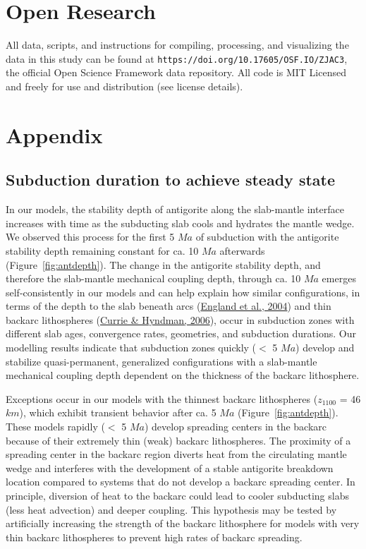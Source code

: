 \documentclass[draft,linenumbers]{agujournal2018}
\begin{document}
\hypertarget{open-research}{%
\section{Open Research}\label{open-research}}

All data, scripts, and instructions for compiling, processing, and
visualizing the data in this study can be found at
\texttt{https://doi.org/10.17605/OSF.IO/ZJAC3}, the official Open
Science Framework data repository. All code is MIT Licensed and freely
for use and distribution (see license details).

\clearpage

\appendix
\section{Appendix}

\hypertarget{subduction-duration-to-achieve-steady-state}{%
\subsection{Subduction duration to achieve steady
state}\label{subduction-duration-to-achieve-steady-state}}

In our models, the stability depth of antigorite along the slab-mantle
interface increases with time as the subducting slab cools and hydrates
the mantle wedge. We observed this process for the first 5 \(Ma\) of
subduction with the antigorite stability depth remaining constant for
ca. 10 \(Ma\) afterwards (Figure~\ref{fig:antdepth}). The change in the
antigorite stability depth, and therefore the slab-mantle mechanical
coupling depth, through ca. 10 \(Ma\) emerges self-consistently in our
models and can help explain how similar configurations, in terms of the
depth to the slab beneath arcs
(\protect\hyperlink{ref-England2004}{England et al., 2004}) and thin
backarc lithospheres (\protect\hyperlink{ref-Currie2006}{Currie \&
Hyndman, 2006}), occur in subduction zones with different slab ages,
convergence rates, geometries, and subduction durations. Our modelling
results indicate that subduction zones quickly (\(<\) 5 \(Ma\)) develop
and stabilize quasi-permanent, generalized configurations with a
slab-mantle mechanical coupling depth dependent on the thickness of the
backarc lithosphere.

Exceptions occur in our models with the thinnest backarc lithospheres
(\(z_{1100}\) = 46 \(km\)), which exhibit transient behavior after ca. 5
\(Ma\) (Figure~\ref{fig:antdepth}). These models rapidly (\(<\) 5
\(Ma\)) develop spreading centers in the backarc because of their
extremely thin (weak) backarc lithospheres. The proximity of a spreading
center in the backarc region diverts heat from the circulating mantle
wedge and interferes with the development of a stable antigorite
breakdown location compared to systems that do not develop a backarc
spreading center. In principle, diversion of heat to the backarc could
lead to cooler subducting slabs (less heat advection) and deeper
coupling. This hypothesis may be tested by artificially increasing the
strength of the backarc lithosphere for models with very thin backarc
lithospheres to prevent high rates of backarc spreading.
\end{document}
